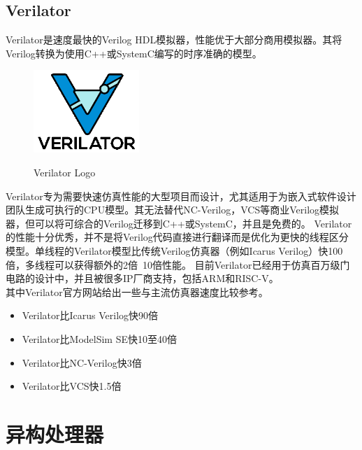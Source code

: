    \subsection{Verilator}
Verilator是速度最快的Verilog HDL模拟器，性能优于大部分商用模拟器。其将Verilog转换为使用C++或SystemC编写的时序准确的模型。
\begin{figure}%
    \includegraphics[width=4cm]{../pdf/verilator.png}\
    \caption{Verilator Logo}
\end{figure}
    Verilator专为需要快速仿真性能的大型项目而设计，尤其适用于为嵌入式软件设计团队生成可执行的CPU模型。其无法替代NC-Verilog，VCS等商业Verilog模拟器，但可以将可综合的Verilog迁移到C++或SystemC，并且是免费的。
Verilator的性能十分优秀，并不是将Verilog代码直接进行翻译而是优化为更快的线程区分模型。单线程的Verilator模型比传统Verilog仿真器（例如Icarus Verilog）快100倍，多线程可以获得额外的2倍~10倍性能。
目前Verilator已经用于仿真百万级门电路的设计中，并且被很多IP厂商支持，包括ARM和RISC-V。\\
其中Verilator官方网站给出一些与主流仿真器速度比较参考。
        \begin{itemize}[topsep = 0 pt]
            \setlength{\topsep}{0pt}
            \setlength{\itemsep}{0pt}
            \setlength{\parsep}{0pt}
            \setlength{\parskip}{0pt}
            \setlength{\partopsep}{0pt}
            \item Verilator比Icarus Verilog快90倍
            \item Verilator比ModelSim SE快10至40倍
            \item Verilator比NC-Verilog快3倍
            \item Verilator比VCS快1.5倍
        \end{itemize}


\section{异构处理器}
